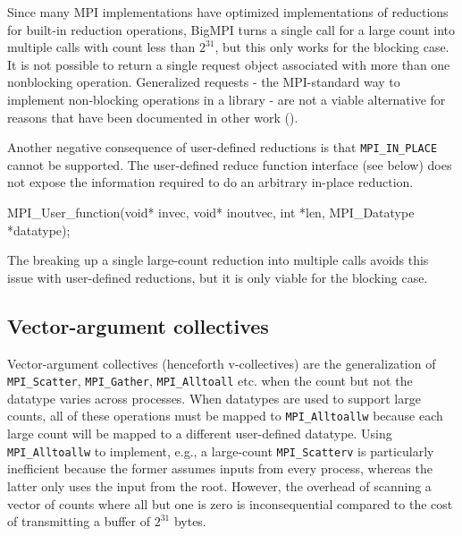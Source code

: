 Since many MPI implementations have optimized implementations of reductions for
built-in reduction operations, BigMPI turns a single call for a large count into multiple
calls with count less than $2^{31}$, but this only works for the blocking case.
It is not possible to return a single request object associated with more than one
nonblocking operation.  
Generalized requests - the MPI-standard way to implement non-blocking operations 
in a library - are not a viable alternative for reasons that have been documented 
in other work (\cite{latham:grequest-extensions}).

Another negative consequence of user-defined reductions is that  \texttt{MPI\_IN\_PLACE}
cannot be supported.  The user-defined reduce function interface (see below) does not expose
the information required to do an arbitrary in-place reduction.
\begin{code}
MPI_User_function(void* invec, void* inoutvec, 
                  int *len, MPI_Datatype *datatype);
\end{code}
The breaking up a single large-count reduction into multiple calls avoids this
issue with user-defined reductions, but it is only viable for the blocking case.

\subsection{Vector-argument collectives}

Vector-argument collectives (henceforth v-collectives) are the generalization of 
\texttt{MPI\_Scatter}, \texttt{MPI\_Gather}, \texttt{MPI\_Alltoall} etc.
when the count but not the datatype varies across processes.
When datatypes are used to support large counts, all of these operations must be
mapped to \texttt{MPI\_Alltoallw} because each large count will be mapped
to a different user-defined datatype.
Using \texttt{MPI\_Alltoallw} to implement, e.g., a large-count \texttt{MPI\_Scatterv} is
particularly inefficient because the former assumes inputs from every process,
whereas the latter only uses the input from the root.
However, the overhead of scanning a vector of counts where all but one is zero
is inconsequential compared to the cost of transmitting a buffer of $2^{31}$ bytes.


